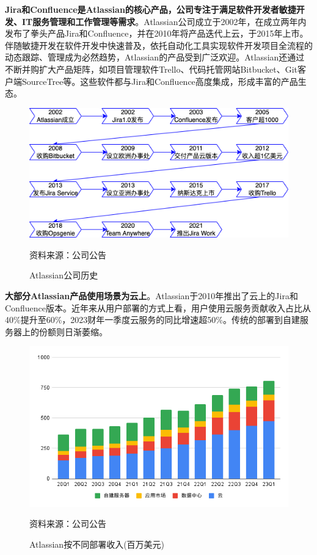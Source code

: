 \textbf{Jira和Confluence是Atlassian的核心产品，公司专注于满足软件开发者敏捷开发、IT服务管理和工作管理等需求}。Atlassian公司成立于2002年，在成立两年内发布了拳头产品Jira和Confluence，并在2010年将产品迭代上云，于2015年上市。伴随敏捷开发在软件开发中快速普及，依托自动化工具实现软件开发项目全流程的动态跟踪、管理成为必然趋势，Atlassian的产品受到广泛欢迎。Atlassian还通过不断并购扩大产品矩阵，如项目管理软件Trello、代码托管网站Bitbucket、Git客户端SourceTree等。这些软件都与Jira和Confluence高度集成，形成丰富的产品生态。
\begin{figure}[H]
    \caption{Atlassian公司历史}
    \begin{center}
        \includegraphics[width=0.8\linewidth]{img/timeline.drawio.png}
    \end{center}
    \footnotesize{资料来源：公司公告}
\end{figure}

\textbf{大部分Atlassian产品使用场景为云上}。Atlassian于2010年推出了云上的Jira和Confluence版本。近年来从用户部署的方式上看，用户使用云服务贡献收入占比从40\%提升至60\%，2023财年一季度云服务的同比增速超50\%。传统的部署到自建服务器上的份额则日渐萎缩。
\begin{figure}[H]
    \caption{Atlassian按不同部署收入(百万美元)}
    \begin{center}
        \includegraphics[width=0.8\linewidth]{img/deployment.png}
    \end{center}
    \footnotesize{资料来源：公司公告}
\end{figure}
